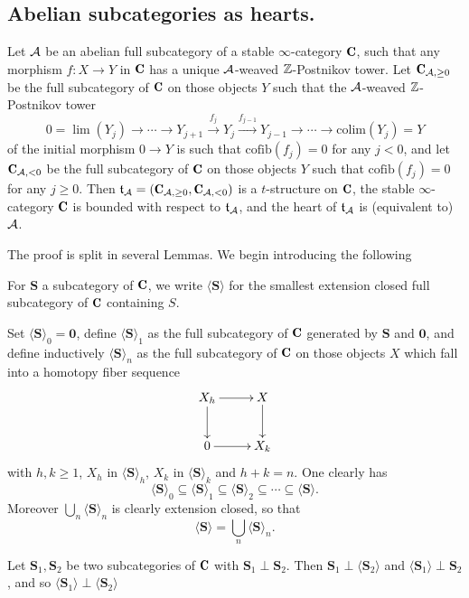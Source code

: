 \documentclass[a4paper,12pt]{amsart}
\begin{document}
\subsection{Abelian subcategories as hearts.}
\begin{proposition}\label{to.be.repeated.verbatim}
Let $\mathcal{A}$ be an abelian full subcategory of a stable $\infty$-category $\C$, such that any morphism $f\colon X\to Y$  in $\C$ has a unique $\mathcal{A}$-weaved $\mathbb{Z}$-Postnikov tower. Let
$\C_{\A,\geq 0}$ be the full subcategory of $\C$ on those objects $Y$ such that  the $\mathcal{A}$-weaved $\mathbb{Z}$-Postnikov tower
\[
0 =\lim(Y_j)\to\cdots \to Y_{j+1} \xrightarrow{f_{j}} Y_{j} \xrightarrow{f_{j-1}}Y_{j-1}\to \cdots\to \mathrm{colim}(Y_j)=Y
\]
of the initial morphism $0\to Y$ is such that $\mathrm{cofib}(f_j)=0$ for any $j< 0$, and let $\C_{\A,< 0}$ be the full subcategory of $\C$ on those objects $Y$ such that $\mathrm{cofib}(f_j)=0$ for any $j\geq 0$. Then $\mathfrak{t}_{\A}=(\C_{\A,\geq 0}, \C_{\A,<0})$ is a $t$-structure on $\C$, the stable $\infty$-category $\C$ is bounded with respect to $\mathfrak{t}_{\mathcal{A}}$, and the heart of $\mathfrak{t}_{\mathcal{A}}$ is (equivalent to) $\mathcal{A}$.
\end{proposition}
 The proof is split in several Lemmas. We begin introducing the following
\begin{notat}
For $\mathbf{S}$ a subcategory of $\C$, we write $\langle \mathbf{S}\rangle$ for the smallest extension closed full subcategory of $\C$ containing $S$.
\end{notat}
\begin{remark}\label{extensions}
Set  $\langle \mathbf{S}\rangle_0=\mathbf{0}$,  define $\langle \mathbf{S}\rangle_1$ as the full subcategory of $\C$ generated by $\mathbf{S}$ and $\mathbf{0}$, and define inductively $\langle \mathbf{S}\rangle_n$ as the full subcategory of $\C$ on those objects $X$ which fall into a homotopy fiber sequence
\[
\xymatrix{
X_h\ar[r]\ar[d]& X\ar[d]\\
0\ar[r] &X_k
}
\]
with $h,k\geq 1$, $X_h$ in $\langle \mathbf{S}\rangle_h$, $X_k$ in $\langle \mathbf{S}\rangle_k$ and $h+k=n$. One clearly has 
\[
\langle \mathbf{S}\rangle_0\subseteq \langle \mathbf{S}\rangle_1 \subseteq \langle \mathbf{S}\rangle_2\subseteq\cdots \subseteq \langle \mathbf{S}\rangle.
\]
Moreover $\bigcup_n \langle \mathbf{S}\rangle_n$ is clearly extension closed, so that
\[
\langle \mathbf{S}\rangle =\bigcup_n \langle \mathbf{S}\rangle_n.
\] 
\end{remark}
\begin{lemma}\label{closure}
Let $\mathbf{S}_1,\mathbf{S}_2$ be two subcategories of $\C$ with $\mathbf{S}_1\perp \mathbf{S}_2$. Then $\mathbf{S}_1\perp \langle\mathbf{S}_2\rangle$ and $\langle\mathbf{S}_1\rangle\perp \mathbf{S}_2$, and so $\langle\mathbf{S}_1\rangle\perp \langle\mathbf{S}_2\rangle$
\end{lemma}
\end{document}
